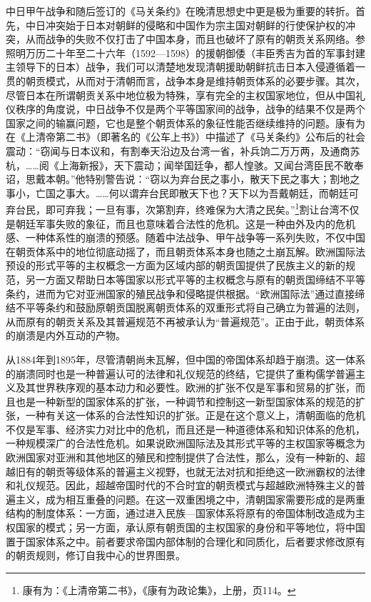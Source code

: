 \documentclass[a4paper, 12pt, openright]{ctexbook}
\begin{document}
中日甲午战争和随后签订的《马关条约》在晚清思想史中更是极为重要的转折。首先，中日冲突始于日本对朝鲜的侵略和中国作为宗主国对朝鲜的行使保护权的冲突，从而战争的失败不仅打击了中国本身，而且也破坏了原有的朝贡关系网络。参照明万历二十年至二十六年（1592—1598）的援朝御倭（丰臣秀吉为首的军事封建主领导下的日本）战争，我们可以清楚地发现清朝援助朝鲜抗击日本入侵遵循着一贯的朝贡模式，从而对于清朝而言，战争本身是维持朝贡体系的必要步骤。其次，尽管日本在所谓朝贡关系中地位极为特殊，享有完全的主权国家地位，但从中国礼仪秩序的角度说，中日战争不仅是两个平等国家间的战争，战争的结果不仅是两个国家之间的输赢问题，它也是整个朝贡体系的象征性能否继续维持的问题。康有为在《上清帝第二书》（即著名的《公车上书》）中描述了《马关条约》公布后的社会震动：“窃闻与日本议和，有割奉天沿边及台湾一省，补兵饷二万万两，及通商苏杭，……阅《上海新报》，天下震动；闻举国廷争，都人惶骇。又闻台湾臣民不敢奉诏，思戴本朝。”他特别警告说：“窃以为弃台民之事小，散天下民之事大；割地之事小，亡国之事大。……何以谓弃台民即散天下也？天下以为吾戴朝廷，而朝廷可弃台民，即可弃我；一旦有事，次第割弃，终难保为大清之民矣。”\footnote{康有为：《上清帝第二书》，《康有为政论集》，上册，页114。}割让台湾不仅是朝廷军事失败的象征，而且也意味着合法性的危机。这是一种由外及内的危机感、一种体系性的崩溃的预感。随着中法战争、甲午战争等一系列失败，不仅中国在朝贡体系中的地位彻底动摇了，而且朝贡体系本身也随之土崩瓦解。欧洲国际法预设的形式平等的主权概念一方面为区域内部的朝贡国提供了民族主义的新的规范，另一方面又帮助日本等国家以形式平等的主权概念与原有的朝贡国缔结不平等条约，进而为它对亚洲国家的殖民战争和侵略提供根据。“欧洲国际法”通过直接缔结不平等条约和鼓励原朝贡国脱离朝贡体系的双重形式将自己确立为普遍的法则，从而原有的朝贡关系及其普遍规范不再被承认为“普遍规范”。正由于此，朝贡体系的崩溃是内外互动的产物。

从1884年到1895年，尽管清朝尚未瓦解，但中国的帝国体系却趋于崩溃。这一体系的崩溃同时也是一种普遍认可的法律和礼仪规范的终结，它提供了重构儒学普遍主义及其世界秩序观的基本动力和必要性。欧洲的扩张不仅是军事和贸易的扩张，而且也是一种新型的国家体系的扩张，一种调节和控制这一新型国家体系的规范的扩张，一种有关这一体系的合法性知识的扩张。正是在这个意义上，清朝面临的危机不仅是军事、经济实力对比中的危机，而且还是一种道德体系和知识体系的危机，一种规模深广的合法性危机。如果说欧洲国际法及其形式平等的主权国家等概念为欧洲国家对亚洲和其他地区的殖民和控制提供了合法性，那么，没有一种新的、超越旧有的朝贡等级体系的普遍主义视野，也就无法对抗和拒绝这一欧洲霸权的法律和礼仪规范。因此，超越帝国时代的不合时宜的朝贡模式与超越欧洲特殊主义的普遍主义，成为相互重叠的问题。在这一双重困境之中，清朝国家需要形成的是两重结构的制度体系：一方面，通过进入民族—国家体系将原有的帝国体制改造成为主权国家的模式；另一方面，承认原有朝贡国的主权国家的身份和平等地位，将中国置于国家体系之中。前者要求帝国内部体制的合理化和同质化，后者要求修改原有的朝贡规则，修订自我中心的世界图景。
\end{document}
